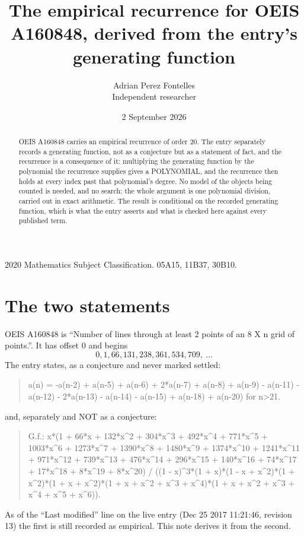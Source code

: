 \documentclass[11pt,a4paper]{article}
\title{The empirical recurrence for OEIS A160848, derived from the entry's generating function}
\author{Adrian Perez Fontelles\\ \small Independent researcher}
\date{2 September 2026}
\theoremstyle{plain}
\theoremstyle{definition}
\begin{document}
\maketitle

\begin{abstract}
OEIS A160848 carries an empirical recurrence of order $20$. The entry separately records a
generating function, not as a conjecture but as a statement of fact, and the recurrence is a
consequence of it: multiplying the generating function by the polynomial the recurrence
supplies gives a POLYNOMIAL, and the recurrence then holds at every index past that
polynomial's degree. No model of the objects being counted is needed, and no search: the
whole argument is one polynomial division, carried out in exact arithmetic. The result is
conditional on the recorded generating function, which is what the entry asserts and what is
checked here against every published term.
\end{abstract}

\noindent\small 2020 Mathematics Subject Classification. 05A15, 11B37, 30B10.\normalsize

\section{The two statements}

OEIS A160848 is ``Number of lines through at least 2 points of an 8 X n grid of points.''. It has offset $0$ and begins
\[
0, 1, 66, 131, 238, 361, 534, 709,\ \dots
\]
The entry states, as a conjecture and never marked settled:
\begin{quote}
a(n) = -a(n-2) + a(n-5) + a(n-6) + 2*a(n-7) + a(n-8) + a(n-9) - a(n-11) - a(n-12) - 2*a(n-13) - a(n-14) - a(n-15) + a(n-18) + a(n-20) for n>21.
\end{quote}
and, separately and NOT as a conjecture:
\begin{quote}
G.f.: x*(1 + 66*x + 132*x\^{}2 + 304*x\^{}3 + 492*x\^{}4 + 771*x\^{}5 + 1003*x\^{}6 + 1273*x\^{}7 + 1390*x\^{}8 + 1480*x\^{}9 + 1374*x\^{}10 + 1241*x\^{}11 + 971*x\^{}12 + 739*x\^{}13 + 476*x\^{}14 + 296*x\^{}15 + 140*x\^{}16 + 74*x\^{}17 + 17*x\^{}18 + 8*x\^{}19 + 8*x\^{}20) / ((1 - x)\^{}3*(1 + x)*(1 - x + x\^{}2)*(1 + x\^{}2)*(1 + x + x\^{}2)*(1 + x + x\^{}2 + x\^{}3 + x\^{}4)*(1 + x + x\^{}2 + x\^{}3 + x\^{}4 + x\^{}5 + x\^{}6)).
\end{quote}
As of the ``Last modified'' line on the live entry (Dec 25 2017 11:21:46, revision 13) the first is still
recorded as empirical. This note derives it from the second.
\end{document}
